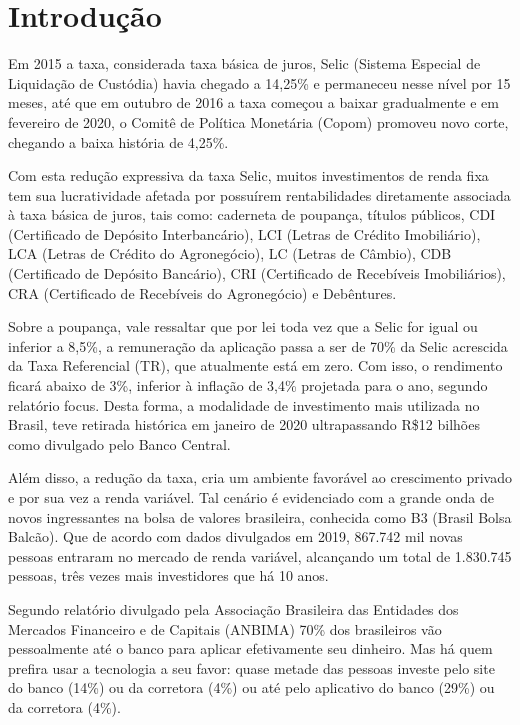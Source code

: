 \chapter{Introdução}

Em 2015 a taxa, considerada taxa básica de juros, Selic (Sistema Especial de Liquidação de Custódia) havia chegado a 14,25\% e permaneceu nesse nível por 15 meses, até que em outubro de 2016 a taxa começou a baixar gradualmente e em fevereiro de 2020, o Comitê de Política Monetária (Copom) promoveu novo corte, chegando a baixa história de 4,25\%.

Com esta redução expressiva da taxa Selic, muitos investimentos de renda fixa tem sua lucratividade afetada por possuírem rentabilidades diretamente associada à taxa básica de juros, tais como: caderneta de poupança, títulos públicos, CDI (Certificado de Depósito Interbancário), LCI (Letras de Crédito Imobiliário), LCA (Letras de Crédito do Agronegócio), LC (Letras de Câmbio), CDB (Certificado de Depósito Bancário), CRI (Certificado de Recebíveis Imobiliários), CRA (Certificado de Recebíveis do Agronegócio) e Debêntures. 

Sobre a poupança, vale ressaltar que por lei toda vez que a Selic for igual ou inferior a 8,5\%, a remuneração da aplicação passa a ser de 70\% da Selic acrescida da Taxa Referencial (TR), que atualmente está em zero. Com isso, o rendimento ficará abaixo de 3\%, inferior à inflação de 3,4\% projetada para o ano, segundo relatório focus. Desta forma, a modalidade de investimento mais utilizada no Brasil, teve retirada histórica em janeiro de 2020 ultrapassando R\$12 bilhões como divulgado pelo Banco Central.

Além disso, a redução da taxa, cria um ambiente favorável ao crescimento privado e por sua vez a renda variável. Tal cenário é evidenciado com a grande onda de novos ingressantes na bolsa de valores brasileira, conhecida como B3 (Brasil Bolsa Balcão). Que de acordo com dados divulgados em 2019, 867.742 mil novas pessoas entraram no mercado de renda variável, alcançando um total de 1.830.745 pessoas, três vezes mais investidores que há 10 anos.

Segundo relatório divulgado pela Associação Brasileira das Entidades dos Mercados Financeiro e de Capitais (ANBIMA) 70\% dos brasileiros vão pessoalmente até o banco para aplicar efetivamente seu dinheiro. Mas há quem prefira usar a tecnologia a seu favor: quase metade das pessoas investe pelo site do banco (14\%) ou da corretora (4\%) ou até pelo aplicativo do banco (29\%) ou da corretora (4\%).

